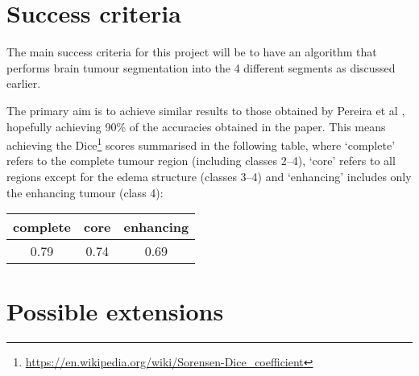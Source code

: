 \documentclass[12pt,a4paper,twoside]{article}
\begin{document}
\section*{Success criteria}

The main success criteria for this project will be to have an algorithm that performs brain tumour segmentation into the 4 different segments as discussed earlier. 

The primary aim is to achieve similar results to those obtained by Pereira et al \cite{pereira}, hopefully achieving 90\% of the accuracies obtained in the paper. This means achieving the Dice\footnote{\url{https://en.wikipedia.org/wiki/Sorensen-Dice\_coefficient}} scores summarised in the following table, where `complete' refers to the complete tumour region (including classes 2--4), `core' refers to all regions except for the edema structure (classes 3--4) and `enhancing' includes only the enhancing tumour (class 4):

\begin{center}
\begin{tabular}{ |c|c|c| } 
\hline
complete & core & enhancing \\
\hline
 0.79 & 0.74 & 0.69  \\ 
\hline
\end{tabular}
\end{center}



\section*{Possible extensions}
\end{document}
